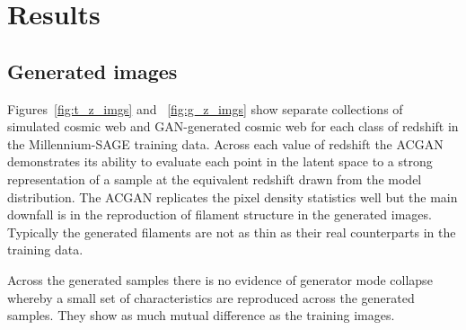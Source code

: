 \documentclass[twocolumn]{article}
\numberwithin{equation}{section}
\begin{document}

\section{Results}\label{sec:results}



\subsection{Generated images}
Figures~\ref{fig:t_z_imgs} and ~\ref{fig:g_z_imgs} show separate collections of simulated cosmic web and GAN-generated 
cosmic web for each class of redshift in the Millennium-SAGE training data. Across each value of redshift the ACGAN 
demonstrates its ability to evaluate each point in the latent space to a strong representation of a sample at the equivalent
redshift drawn from the model distribution. The ACGAN replicates the pixel density statistics well but the main downfall is 
in the reproduction of filament structure in the generated images. Typically the generated filaments are not as thin as their 
real counterparts in the training data. 

Across the generated samples there is no evidence of generator mode collapse whereby a small set of characteristics are 
reproduced across the generated samples. They show as much mutual difference as the training images.

\end{document}
